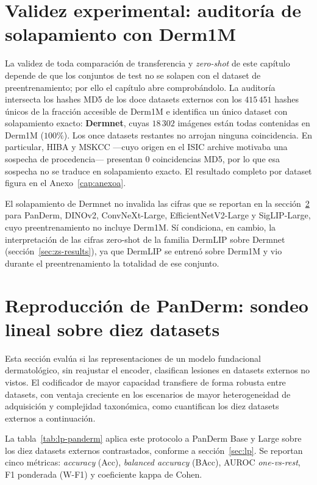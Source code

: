 \section{Validez experimental: auditoría de solapamiento con Derm1M}
\label{sec:auditoria-resultados}

La validez de toda comparación de transferencia y \emph{zero-shot}
de este capítulo depende de que los conjuntos de test no se solapen
con el dataset de preentrenamiento; por ello el capítulo abre
comprobándolo. La auditoría intersecta los hashes MD5 de los doce
datasets externos con los $415\,451$ hashes únicos de la fracción
accesible de Derm1M e identifica un único dataset con solapamiento
exacto: \textbf{Dermnet}, cuyas $18\,302$ imágenes están todas
contenidas en Derm1M ($100\%$). Los once datasets restantes no
arrojan ninguna coincidencia. En particular, HIBA y MSKCC ---cuyo
origen en el ISIC archive motivaba una sospecha de procedencia---
presentan $0$ coincidencias MD5, por lo que esa sospecha no se
traduce en solapamiento exacto. El resultado completo por dataset
figura en el Anexo~\ref{cap:anexoa}.

El solapamiento de Dermnet no invalida las cifras que se reportan en
la sección~\ref{sec:rep-panderm} para PanDerm, DINOv2,
ConvNeXt-Large, EfficientNetV2-Large y SigLIP-Large, cuyo
preentrenamiento no incluye Derm1M. Sí condiciona, en cambio, la
interpretación de las cifras zero-shot de la familia DermLIP sobre
Dermnet (sección~\ref{sec:zs-results}), ya que DermLIP se entrenó
sobre Derm1M y vio durante el preentrenamiento la totalidad de ese
conjunto.

\section{Reproducción de PanDerm: sondeo lineal sobre diez datasets}
\label{sec:rep-panderm}

Esta sección evalúa si las representaciones de un modelo fundacional
dermatológico, sin reajustar el encoder, clasifican lesiones en
datasets externos no vistos. El codificador de mayor capacidad
transfiere de forma robusta entre datasets, con ventaja creciente en
los escenarios de mayor heterogeneidad de adquisición y complejidad
taxonómica, como cuantifican los diez datasets externos a continuación.

La tabla~\ref{tab:lp-panderm} aplica este protocolo a PanDerm Base y
Large sobre los diez datasets externos contrastados, conforme a
sección~\ref{sec:lp}. Se reportan cinco métricas: \emph{accuracy}
(Acc), \emph{balanced accuracy} (BAcc), AUROC \emph{one-vs-rest}, F1
ponderada (W-F1) y coeficiente kappa de Cohen.

